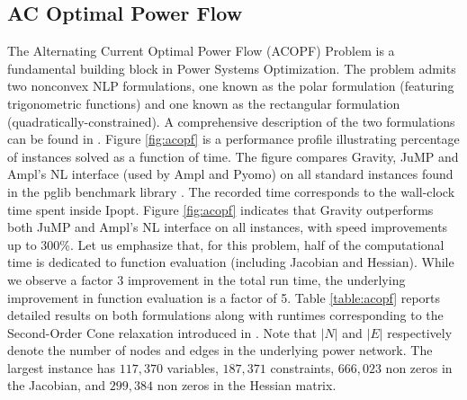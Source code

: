 \documentclass{article}
\newcommand{\ipopt}{{\sc Ipopt}}
\newcommand{\ampl}{{\sc Ampl}}
\newcommand{\Gravity}{{\sc Gravity}}
\newcommand{\pyomo}{{\sc Pyomo}}
\newcommand{\jump}{{\sc JuMP}}
\begin{document}

\subsection{AC Optimal Power Flow}
The Alternating Current Optimal Power Flow (ACOPF) Problem is a fundamental building block in Power Systems Optimization.
The problem admits two nonconvex NLP formulations, one known as the polar formulation (featuring \mbox{trigonometric} functions) and one known as the rectangular formulation (quadratically-constrained).
A comprehensive description of the two formulations can be found in \cite{qc_mpc_17}.
Figure \ref{fig:acopf} is a performance profile illustrating percentage of instances solved as a function of time.
The figure compares \Gravity{}, \jump{} and \ampl{}'s NL interface (used by \ampl{} and \pyomo) on all standard instances found in the pglib benchmark library \cite{pglib_opf}. The recorded time corresponds to the wall-clock time spent inside \ipopt{}. Figure \ref{fig:acopf} indicates that \mbox{\Gravity{}} outperforms both \jump{} and \ampl{}'s NL interface on all instances, with speed improvements up to 300\%.
Let us emphasize that, for this problem, half of the computational time is dedicated to function evaluation (including Jacobian and Hessian). While we observe a factor 3 improvement in the total run time, the underlying improvement in function evaluation is a factor of 5. 
Table \ref{table:acopf} reports detailed results on both formulations along with runtimes corresponding to the Second-Order Cone relaxation introduced in \cite{Jabr_06}.
Note that $|N|$ and $|E|$ respectively denote the number of nodes and edges in the underlying power network. The largest instance has $117,370$ variables, $187,371$ constraints, $666,023$ non zeros in the Jacobian, and $299,384$ non zeros in the Hessian matrix.


%
\end{document}
